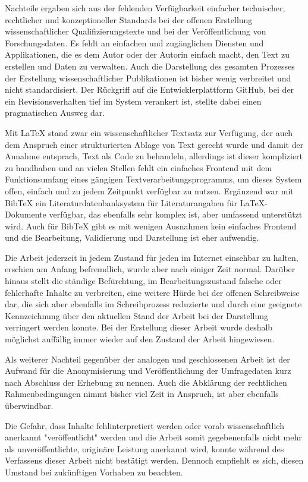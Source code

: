 Nachteile ergaben sich aus der fehlenden Verfügbarkeit einfacher technischer, rechtlicher und konzeptioneller Standards bei der offenen Erstellung wissenschaftlicher Qualifizierungstexte und bei der Veröffentlichung von Forschungsdaten. Es fehlt an einfachen und zugänglichen Diensten und Applikationen, die es dem Autor oder der Autorin einfach macht, den Text zu erstellen und Daten zu verwalten. Auch die Darstellung des gesamten Prozesses der Erstellung wissenschaftlicher Publikationen ist bisher wenig verbreitet und nicht standardisiert. Der Rückgriff auf die Entwicklerplattform GitHub, bei der ein Revisionsverhalten tief im System verankert ist, stellte dabei einen pragmatischen Ausweg dar.

Mit LaTeX stand zwar ein wissenschaftlicher Textsatz zur Verfügung, der auch dem Anspruch einer strukturierten Ablage von Text gerecht wurde und damit der Annahme entsprach, Text als Code zu behandeln, allerdings ist dieser kompliziert zu handhaben und an vielen Stellen fehlt ein einfaches Frontend mit dem Funktionsumfang eines gängigen Textverarbeitungsprogramms, um dieses System offen, einfach und zu jedem Zeitpunkt verfügbar zu nutzen. Ergänzend war mit BibTeX ein Literaturdatenbanksystem für Literaturangaben für LaTeX-Dokumente verfügbar, das ebenfalls sehr komplex ist, aber umfassend unterstützt wird. Auch für BibTeX gibt es mit wenigen Ausnahmen kein einfaches Frontend und die Bearbeitung, Validierung und Darstellung ist eher aufwendig.

Die Arbeit jederzeit in jedem Zustand für jeden im Internet einsehbar zu halten, erschien am Anfang befremdlich, wurde aber nach einiger Zeit normal. Darüber hinaus stellt die ständige Befürchtung, im Bearbeitungszustand falsche oder fehlerhafte Inhalte zu verbreiten, eine weitere Hürde bei der offenen Schreibweise dar, die sich aber ebenfalls im Schreibprozess reduzierte und durch eine geeignete Kennzeichnung über den aktuellen Stand der Arbeit bei der Darstellung verringert werden konnte. Bei der Erstellung dieser Arbeit wurde deshalb möglichst auffällig immer wieder auf den Zustand der Arbeit hingewiesen.

Als weiterer Nachteil gegenüber der analogen und geschlossenen Arbeit ist der Aufwand für die Anonymisierung und Veröffentlichung der Umfragedaten kurz nach Abschluss der Erhebung zu nennen. Auch die Abklärung der rechtlichen Rahmenbedingungen nimmt bisher viel Zeit in Anspruch, ist aber ebenfalls überwindbar.

Die Gefahr, dass Inhalte fehlinterpretiert werden oder vorab wissenschaftlich anerkannt "veröffentlicht" werden und die Arbeit somit gegebenenfalls nicht mehr als unveröffentlichte, originäre Leistung anerkannt wird, konnte während des Verfassens dieser Arbeit nicht bestätigt werden. Dennoch empfiehlt es sich, diesen Umstand bei zukünftigen Vorhaben zu beachten.

